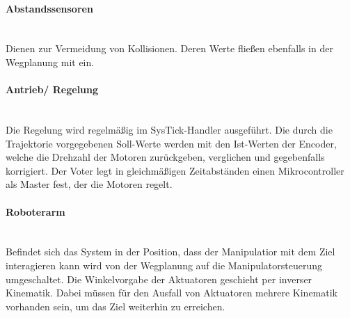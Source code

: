 \paragraph{Abstandssensoren}$\;$\\
Dienen zur Vermeidung von Kollisionen. Deren Werte fließen ebenfalls in der Wegplanung mit ein.

\paragraph{Antrieb/ Regelung}$\;$\\
Die Regelung wird regelmäßig im SysTick-Handler ausgeführt. Die durch die Trajektorie vorgegebenen Soll-Werte werden mit den Ist-Werten der Encoder, welche die Drehzahl der Motoren zurückgeben, verglichen und gegebenfalls korrigiert. Der Voter legt in gleichmäßigen Zeitabständen einen Mikrocontroller als Master fest, der die Motoren regelt.

\paragraph{Roboterarm}$\;$\\
Befindet sich das System in der Position, dass der Manipulatior mit dem Ziel interagieren kann wird von der Wegplanung auf die Manipulatorsteuerung umgeschaltet. Die Winkelvorgabe der Aktuatoren geschieht per inverser Kinematik. Dabei müssen für den Ausfall von Aktuatoren mehrere Kinematik vorhanden sein, um das Ziel weiterhin zu erreichen.
 
